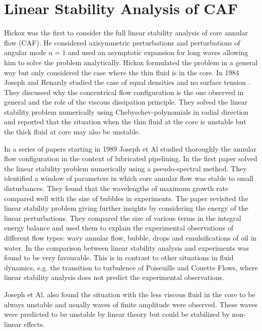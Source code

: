 

\section*{Linear Stability Analysis of CAF}
Hickox \cite{Hickox} was the first to consider the full linear stability analysis of core annular flow (CAF). 
He considered axisymmetric perturbations and perturbations of angular mode $n=1$ and used an asymptotic expansion for long waves allowing him to solve the problem analytically. 
Hickox formulated the problem in a general way but only considered the case where the thin fluid is in the core. 
In 1984 Joseph and Renardy studied the case of equal densities and no surface tension \cite{JRR84}. 
They discussed why the concentrical flow configuration is the one observed in general and the role of the viscous dissipation principle. 
They solved the linear stability problem numerically using Chebyschev-polynomials in radial direction and reported that the situation when the thin fluid at the core is unstable but the thick fluid at core may also be unstable.\par
In a series of papers \cite{SCAF1,SCAF2,SCAF3,SCAF4,SCAF5} starting in 1989 Joseph et Al studied thoroughly the annular flow configuration in the context of lubricated pipelining. 
In the first paper \cite{SCAF1} solved the linear stability problem numerically using a pseudo-spectral method. 
They identified a window of parameters in which core annular flow was stable to small disturbances. 
They found that the wavelengths of maximum growth rate compared well with the size of bubbles in experiments. 
The paper \cite{SCAF2} revisited the linear stability problem giving further insights by considering the energy of the linear perturbations. 
They compared the size of various terms in the integral energy balance and used them to explain the experimental observations of different flow types: wavy annular flow, bubble, drops and emulsifications of oil in water. 
In \cite{SCAF1,SCAF2} the comparison between linear stability analysis and experiments was found to be very favourable. 
This is in contrast to other situations in fluid dynamics, e.g. the transition to turbulence of Poiseuille and Couette Flows, where linear stability analysis does not predict the experimental observations.\par
Joseph et Al. also found the situation with the less viscous fluid in the core to be always unstable and usually waves of finite amplitude were observed. 
These waves were predicted to be unstable by linear theory but could be stabilized by non-linear effects. 
